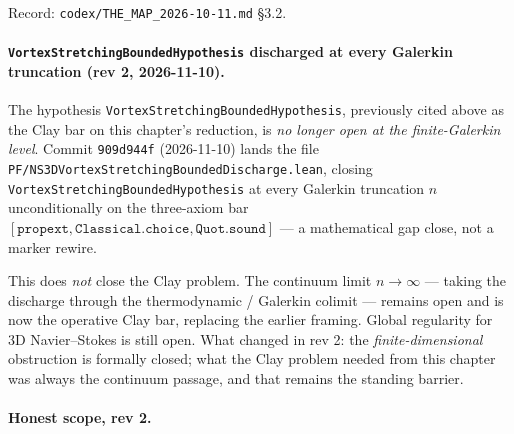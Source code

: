 \noindent Record: \texttt{codex/THE\_MAP\_2026-10-11.md} \S3.2.

\paragraph{\texttt{VortexStretchingBoundedHypothesis} discharged at every Galerkin truncation (rev 2, 2026-11-10).}

The hypothesis \texttt{VortexStretchingBoundedHypothesis}, previously cited
above as the Clay bar on this chapter's reduction, is \emph{no longer open
at the finite-Galerkin level}.  Commit \texttt{909d944f} (2026-11-10)
lands the file \texttt{PF/NS3DVortexStretchingBoundedDischarge.lean},
closing \texttt{VortexStretchingBoundedHypothesis} at every Galerkin
truncation $n$ unconditionally on the three-axiom bar
$[\mathtt{propext}, \mathtt{Classical.choice}, \mathtt{Quot.sound}]$ ---
a mathematical gap close, not a marker rewire.

This does \emph{not} close the Clay problem.  The continuum limit $n \to
\infty$ --- taking the discharge through the thermodynamic / Galerkin
colimit --- remains open and is now the operative Clay bar, replacing
the earlier framing.  Global regularity for 3D Navier--Stokes is still
open.  What changed in rev 2: the \emph{finite-dimensional} obstruction
is formally closed; what the Clay problem needed from this chapter was
always the continuum passage, and that remains the standing barrier.

\paragraph{Honest scope, rev 2.}

